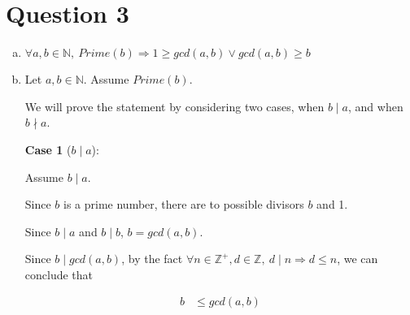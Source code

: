 \documentclass[12pt]{article}
\begin{document}
\section*{Question 3}
\begin{enumerate}[a.]
    \item

    $\forall a,b \in \mathbb{N},\:Prime(b) \Rightarrow 1 \geq gcd(a,b) \lor
    gcd(a,b) \geq b$

    \item

    Let $a,b \in \mathbb{N}$. Assume $Prime(b)$.

    \bigskip

    We will prove the statement by considering two cases, when $b \mid a$, and
    when $b \nmid a$.

    \bigskip

    \textbf{Case 1} ($b \mid a$):

    \bigskip

    Assume $b \mid a$.

    \bigskip

    Since $b$ is a prime number, there are to possible divisors $b$ and 1.

    \bigskip

    Since $b \mid a$ and $b \mid b$, $b = gcd(a,b)$.

    \bigskip

    Since $b \mid gcd(a,b)$, by the fact $\forall n \in \mathbb{Z}^{+},
    d \in \mathbb{Z},\: d \mid n \Rightarrow d \leq n$, we can conclude that

    \setcounter{equation}{0}
    \begin{align}
        b &\leq gcd(a,b)
    \end{align}

\end{enumerate}
\end{document}
